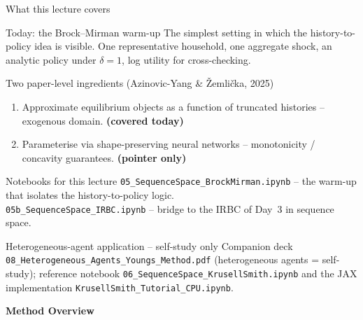 \documentclass[aspectratio=169,11pt]{beamer}
\newcommand{\emphc}[1]{\textcolor{harvardcrimson}{#1}}
\begin{document}
\begin{frame}{What this lecture covers}
\small
\begin{block}{Today: the Brock--Mirman warm-up}
The simplest setting in which the history-to-policy idea is visible. One representative household, one aggregate shock, an analytic policy under $\delta=1$, log utility for cross-checking.
\end{block}

\begin{block}{Two paper-level ingredients (Azinovic-Yang \& \v{Z}emli\v{c}ka, 2025)}
\begin{enumerate}\itemsep1pt
    \item Approximate equilibrium objects as a function of \emphc{truncated histories} -- exogenous domain. \;\textbf{(covered today)}
    \item Parameterise via \emphc{shape-preserving neural networks} -- monotonicity / concavity guarantees. \;\textbf{(pointer only)}
\end{enumerate}
\end{block}

\begin{block}{Notebooks for this lecture}
\texttt{05\_SequenceSpace\_BrockMirman.ipynb} -- the warm-up that isolates the history-to-policy logic.\\
\texttt{05b\_SequenceSpace\_IRBC.ipynb} -- bridge to the IRBC of Day~3 in sequence space.
\end{block}

\begin{block}{Heterogeneous-agent application -- self-study only}
Companion deck \texttt{08\_Heterogeneous\_Agents\_Youngs\_Method.pdf} (heterogeneous agents = self-study); reference notebook \texttt{06\_SequenceSpace\_KrusellSmith.ipynb} and the JAX implementation \texttt{KrusellSmith\_Tutorial\_CPU.ipynb}.
\end{block}
\end{frame}



\begin{frame}{}
\centering\vspace{2.0cm}
{\Huge\color{uzhblue}\textbf{Method Overview}}
\end{frame}
\end{document}
